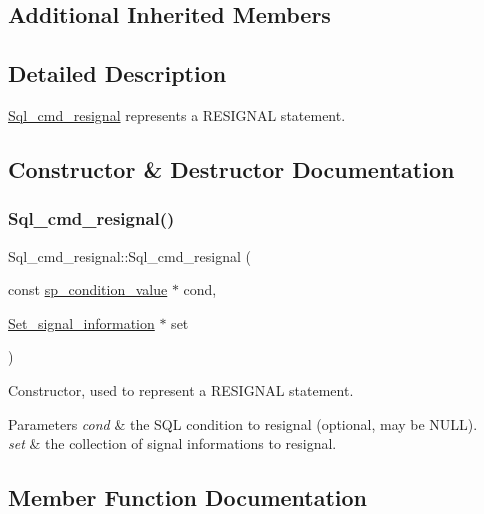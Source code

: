 \subsection*{Additional Inherited Members}


\subsection{Detailed Description}
\mbox{\hyperlink{classSql__cmd__resignal}{Sql\+\_\+cmd\+\_\+resignal}} represents a R\+E\+S\+I\+G\+N\+AL statement. 

\subsection{Constructor \& Destructor Documentation}
\mbox{\label{classSql__cmd__resignal_a54565abda6241ad99d005593e0c246b6}} 
\subsubsection{\texorpdfstring{Sql\+\_\+cmd\+\_\+resignal()}{Sql\_cmd\_resignal()}}
{\footnotesize\ttfamily Sql\+\_\+cmd\+\_\+resignal\+::\+Sql\+\_\+cmd\+\_\+resignal (\begin{DoxyParamCaption}\item[{const \mbox{\hyperlink{classsp__condition__value}{sp\+\_\+condition\+\_\+value}} $\ast$}]{cond,  }\item[{\mbox{\hyperlink{classSet__signal__information}{Set\+\_\+signal\+\_\+information}} $\ast$}]{set }\end{DoxyParamCaption})\hspace{0.3cm}{\ttfamily [inline]}}

Constructor, used to represent a R\+E\+S\+I\+G\+N\+AL statement. 
\begin{DoxyParams}{Parameters}
{\em cond} & the S\+QL condition to resignal (optional, may be N\+U\+LL). \\
\hline
{\em set} & the collection of signal informations to resignal. \\
\hline
\end{DoxyParams}


\subsection{Member Function Documentation}
\mbox{\label{classSql__cmd__resignal_a90366018b66b37bf6fd101b01c49dbf2}} 
